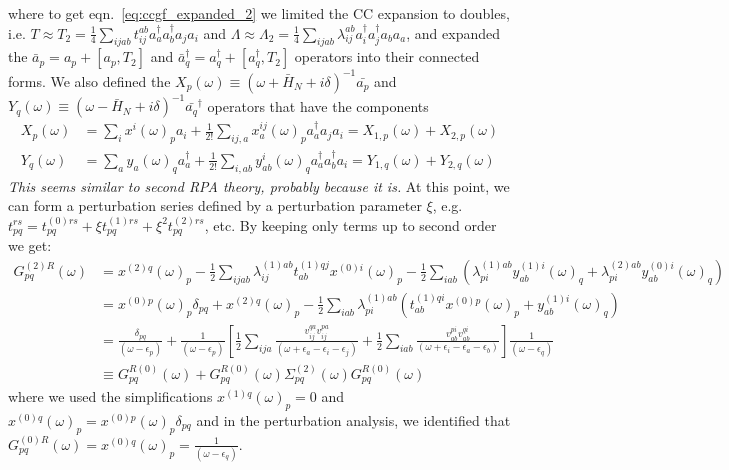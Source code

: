 where to get eqn.~\ref{eq:ccgf_expanded_2} we limited the CC expansion to doubles, i.e. $T\approx T_2=\frac{1}{4} \sum_{i j a b} t_{i j}^{a b} a_a^{\dagger} a_b^{\dagger} a_j a_i$ and $\Lambda\approx\Lambda_2=\frac{1}{4} \sum_{i j a b} \lambda_{i j}^{a b} a_i^{\dagger} a_j^{\dagger} a_b a_a$, and expanded the $\bar{a}_p = a_p + [a_p,T_2]$ and $\bar{a}_q^{\dagger} = a_q^{\dagger} + [a_q^{\dagger},T_2]$ operators into their connected forms. We also defined the $X_p(\omega)\equiv (\omega + \bar{H}_N + i\delta)^{-1} \bar{a_p}$ and $Y_q(\omega)\equiv (\omega - \bar{H}_N + i\delta)^{-1} \bar{a_q}^{\dagger}$ operators that have the components
\begin{align}
    X_p(\omega) & =\sum_i x^i(\omega)_p a_i+\frac{1}{2!} \sum_{i j, a} x_a^{i j}(\omega)_p a_a^{\dagger} a_j a_i=X_{1, p}(\omega)+X_{2, p}(\omega) \\
Y_q(\omega) & =\sum_a y_a(\omega)_q a_a^{\dagger}+\frac{1}{2!} \sum_{i, a b} y_{a b}^i(\omega)_q a_a^{\dagger} a_b^{\dagger} a_i=Y_{1, q}(\omega)+Y_{2, q}(\omega)
\end{align}
\emph{This seems similar to second RPA theory, probably because it is.}
At this point, we can form a perturbation series defined by a perturbation parameter $\xi$, e.g. $t_{p q}^{r s}=t_{p q}^{(0) r s}+\xi t_{p q}^{(1) r s}+\xi^2 t_{p q}^{(2) r s}$, etc. By keeping only terms up to second order we get:
\begin{align}
G_{p q}^{(2)R}(\omega) &= x^{(2) q}(\omega)_p-\frac{1}{2} \sum_{i j a b} \lambda_{i j}^{(1) a b} t_{a b}^{(1) q j} x^{(0) i}(\omega)_p-\frac{1}{2} \sum_{i a b}\left(\lambda_{p i}^{(1) a b} y_{a b}^{(1) i}(\omega)_q+\lambda_{p i}^{(2) a b} y_{a b}^{(0) i}(\omega)_q\right) \\
&= x^{(0) p}(\omega)_p \delta_{p q}+x^{(2) q}(\omega)_p-\frac{1}{2} \sum_{i a b} \lambda_{p i}^{(1) a b}\left(t_{a b}^{(1) q i} x^{(0) p}(\omega)_p+y_{a b}^{(1) i}(\omega)_q\right) \\
&= \frac{\delta_{pq}}{(\omega-\epsilon_p)} + \frac{1}{(\omega-\epsilon_p)} \left[ \frac{1}{2}\sum_{ija} \frac{v^{qa}_{ij}v^{pa}_{ij}}{(\omega+\epsilon_a-\epsilon_i-\epsilon_j)} + \frac{1}{2}\sum_{iab} \frac{v^{pi}_{ab}v^{qi}_{ab}}{(\omega+\epsilon_i-\epsilon_a-\epsilon_b)} \right] \frac{1}{(\omega-\epsilon_q)} \\
&\equiv G_{pq}^{R(0)} (\omega) + G_{pq}^{R(0)} (\omega) \Sigma_{pq}^{(2)}(\omega) G_{pq}^{R(0)} (\omega)
\end{align}
 where we used the simplifications $x^{(1) q}(\omega)_p=0$ and $x^{(0) q}(\omega)_p=x^{(0) p}(\omega)_p \delta_{p q}$ and in the perturbation analysis, we identified that $G_{p q}^{(0) R}(\omega)=x^{(0) q}(\omega)_p= \frac{1}{(\omega-\epsilon_q)}$.
